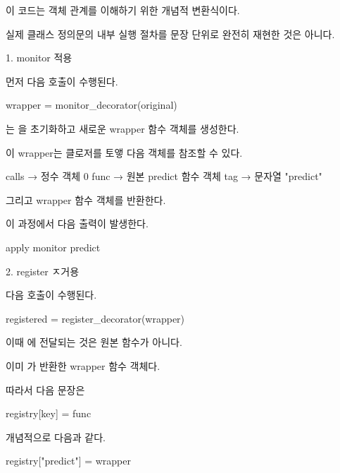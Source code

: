 이 코드는 객체 관계를 이해하기 위한 개념적 변환식이다.

실제 클래스 정의문의 내부 실행 절차를 문장 단위로 완전히 재현한 것은 아니다.

\begin{dhknote}
\begin{dhksmry}[centered]
1. monitor 적용
\end{dhksmry}
\end{dhknote}

먼저 다음 호출이 수행된다.

\begin{dhkcode}
wrapper = monitor_decorator(original)
\end{dhkcode}

는 을 초기화하고 새로운 wrapper 함수 객체를 생성한다.

이 wrapper는 클로저를 토앻 다음 객체를 참조할 수 있다.

\begin{dhkzsh}
calls → 정수 객체 0
func  → 원본 predict 함수 객체
tag   → 문자열 "predict"
\end{dhkzsh}

그리고 wrapper 함수 객체를 반환한다.

이 과정에서 다음 출력이 발생한다.

\begin{dhkzsh}
apply monitor predict
\end{dhkzsh}

\begin{dhknote}
\begin{dhksmry}[centered]
2. register ㅈ거용
\end{dhksmry}
\end{dhknote}

다음 호출이 수행된다.

\begin{dhkcode}
registered = register_decorator(wrapper)
\end{dhkcode}

이때 에 전달되는 것은 원본 함수가 아니다.

이미 가 반환한 wrapper 함수 객체다.

따라서 다음 문장은

\begin{dhkcode}
registry[key] = func
\end{dhkcode}

개념적으로 다음과 같다.

\begin{dhkcode}
registry["predict"] = wrapper
\end{dhkcode}

